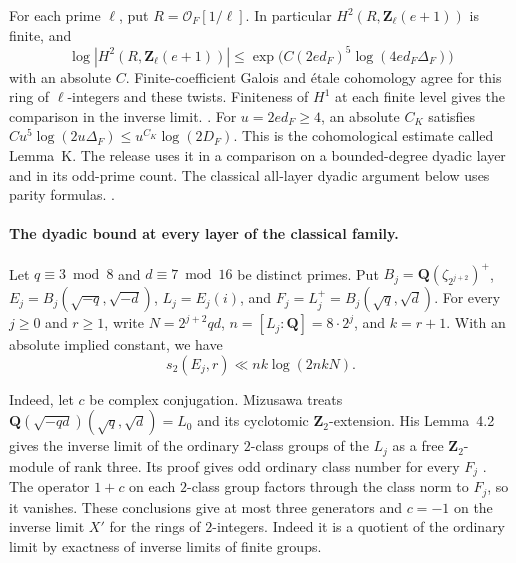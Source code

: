 For each prime \(\ell\), put \(R=\mathcal O_F[1/\ell]\). In
particular \(H^2(R,\mathbf Z_\ell(e+1))\) is finite, and
\begin{equation}
\label{eq:family-lemma-k}
 \log|H^2(R,\mathbf Z_\ell(e+1))|
 \le \exp\bigl(C(2ed_F)^5\log(4ed_F\Delta_F)\bigr)
\end{equation}
with an absolute \(C\). Finite-coefficient Galois and \'etale
cohomology agree for this ring of \(\ell\)-integers and these twists.
Finiteness of \(H^1\) at each finite level gives the comparison
in the inverse limit.
.
For \(u=2ed_F\ge4\), an absolute \(C_K\) satisfies
\(C u^5\log(2u\Delta_F)\le u^{C_K}\log(2D_F)\).
This is the cohomological estimate called Lemma~K. The release uses it in a
comparison on a bounded-degree dyadic layer and in its odd-prime
count. The classical all-layer dyadic argument below uses parity
formulas.
.

\paragraph{The dyadic bound at every layer of the classical family.}
%
%
Let \(q\equiv3\bmod8\) and \(d\equiv7\bmod16\) be distinct primes.
Put \(B_j=\mathbf Q(\zeta_{2^{j+2}})^+\),
\(E_j=B_j(\sqrt{-q},\sqrt{-d})\), \(L_j=E_j(i)\), and
\(F_j=L_j^+=B_j(\sqrt q,\sqrt d)\). For every \(j\ge0\) and \(r\ge1\),
write \(N=2^{j+2}qd\), \(n=[L_j:\mathbf Q]=8\cdot2^j\), and \(k=r+1\).
With an absolute implied constant, we have
\begin{equation}
\label{eq:classical-dyadic-all-layers}
 s_2(E_j,r)\ll n k\log(2nkN).
\end{equation}

Indeed, let \(c\) be complex conjugation. Mizusawa treats
\(\mathbf Q(\sqrt{-qd})(\sqrt q,\sqrt d)=L_0\) and its cyclotomic
\(\mathbf Z_2\)-extension. His Lemma~4.2 gives the inverse limit of
the ordinary \(2\)-class groups of the \(L_j\) as a free
\(\mathbf Z_2\)-module of rank three. Its proof gives odd ordinary
class number for every \(F_j\)
\cite[\S4.2, Lemma~4.2 and its proof, p.~126]{f2-mizusawa-dyadic}.
The operator \(1+c\) on each \(2\)-class group factors through the
class norm to \(F_j\), so it vanishes. These conclusions give at
most three generators and \(c=-1\) on the inverse limit \(X'\) for
the rings of \(2\)-integers. Indeed it is a quotient of the ordinary
limit by exactness of inverse limits of finite groups.

